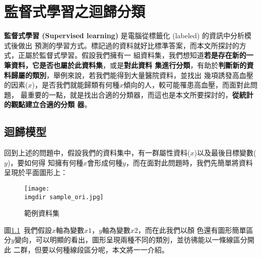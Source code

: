 %
%
\chapter{ \MJH 監督式學習之迴歸分類}
	\textbf{監督式學習 (Supervised learning)} 是電腦從標籤化 (labeled) 的資訊中分析模式後做出		預測的學習方式。標記過的資料就好比標準答案，而本文所探討的方式，正屬於監督式學習。假設我們擁有一		組資料集，我們想知道\textbf{若是存在新的一筆資料，它是否也屬於此資料集}，或是\textbf{對此資料		集進行分類}，有助於\textbf{判斷新的資料歸屬的類別}，舉例來說，若我們能得到大量醫院資料，並找出		幾項誘發高血壓的因素($x$)，是否我們就能歸類有何種$x$傾向的人，較可能罹患高血壓，而面對此問題，		最重要的一點，就是找出合適的分類器，而這也是本文所要探討的，\textbf{從統計的觀點建立合適的分類		器}。
	\section{迴歸模型}
		回到上述的問題中，假設我們的資料集中，有一群屬性資料($x$)以及最後目標變數($y$)，要如何得			知擁有何種$x$會形成何種$y$，而在面對此問題時，我們先簡單將資料呈現於平面圖形上：
		\begin{figure}[H]	
			\centering	 			 	 
   			\texttt{[image: \\imgdir sample\_ori.jpg]} 
   			\caption{範例資料集}
   			\label{fig:sample_ori}   			 		 
		\end{figure}
		圖\ref{fig:sample_ori}\ 我們假設$x$軸為變數$x1$，$y$軸為變數$x2$，而在此我們以顏			色還有圖形簡單區分$y$變向，可以明顯的看出，圖形呈現兩種不同的類別，並彷彿能以一條線區分開此			二群，但要以何種線段區分呢，本文將一一介紹。		
